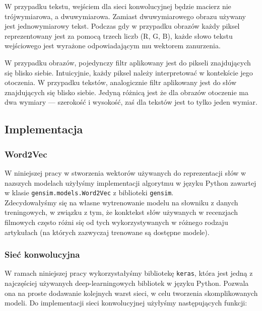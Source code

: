 W przypadku tekstu, wejściem dla sieci konwolucyjnej będzie macierz nie trójwymiarowa, a dwuwymiarowa. Zamiast dwuwymiarowego obrazu używany jest jednowymiarowy tekst. Podczas gdy w przypadku obrazów każdy piksel reprezentowany jest za pomocą trzech liczb (R, G, B), każde słowo tekstu wejściowego jest wyrażone odpowiadającym mu wektorem zanurzenia.

W przypadku obrazów, pojedynczy filtr aplikowany jest do pikseli znajdujących się blisko siebie. Intuicyjnie, każdy piksel należy interpretować w kontekście jego otoczenia. W przypadku tekstów, analogicznie filtr aplikowany jest do słów znajdujących się blisko siebie. Jedyną różnicą jest że dla obrazów otoczenie ma dwa wymiary --- szerokość i wysokość, zaś dla tekstów jest to tylko jeden wymiar.

\subsection{Implementacja}

\subsubsection{Word2Vec}
\label{subsubsec:w2v}

W niniejszej pracy w stworzenia wektorów używanych do reprezentacji słów w nazszych modelach użyłyśmy implementacji algorytmu w języku Python zawartej w klasie \verb_gensim.models.Word2Vec_ z biblioteki \verb_gensim_. 
\\Zdecydowałyśmy się na własne wytrenowanie modelu na słowniku z danych treningowych, w związku z tym, że konktekst słów używanych w recenzjach filmowych często różni się od tych wykorzystywanych w różnego rodzaju artykułach (na których zazwyczaj trenowane są dostępne modele).

\subsubsection{Sieć konwolucyjna} 

W ramach niniejszej pracy wykorzystałyśmy bibliotekę \verb_keras_, która jest jedną z najczęściej używanych deep-learningowych bibliotek w języku Python. Pozwala ona na proste dodawanie kolejnych warst sieci, w celu tworzenia skomplikowanych modeli.
Do implementacji sieci konwolucyjnej użyłyśmy następujących funkcji:

